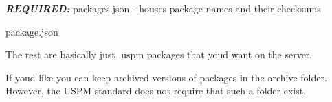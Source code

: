 {\itshape {\bfseries{R\+E\+Q\+U\+I\+R\+ED\+:}}} {\ttfamily packages.\+json} -\/ houses package names and their checksums

package.\+json 
\begin{DoxyCode}{0}
\DoxyCodeLine{\{}
\DoxyCodeLine{\}}
\end{DoxyCode}


The rest are basically just .uspm packages that you\textquotesingle{}d want on the server. 
\begin{DoxyCode}{0}
\end{DoxyCode}


If you\textquotesingle{}d like you can keep archived versions of packages in the {\ttfamily archive} folder. However, the U\+S\+PM standard does not require that such a folder exist. 